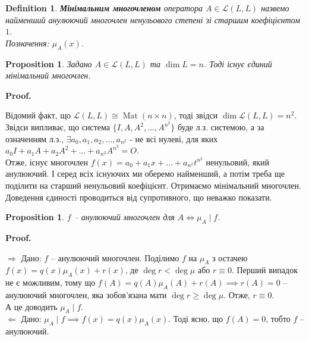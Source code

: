 \documentclass[a4paper, 10pt]{article}
\makeatletter
\def\rightproof{$\boxed{\Rightarrow}$ }
\def\leftproof{$\boxed{\Leftarrow}$ }
\theoremstyle{theoremdd}
\newtheorem{definition}[theorem]{Definition}
\newtheorem{proposition}[theorem]{Proposition}
\DeclareMathOperator{\Mat}{Mat}
\renewenvironment{proof}[1][Proof.\\]{\par
\pushQED{\hfill \qed}%
\normalfont \topsep6\p@\@plus6\p@\relax
\trivlist
\item\relax
{\bfseries
#1\@addpunct{.}}\hspace\labelsep\ignorespaces
}{%
\popQED\endtrivlist\@endpefalse
}
\makeatother
\begin{document}
\begin{definition}
\textbf{Мінімальним многочленом} оператора $A \in \mathcal{L}(L,L)$ назвемо найменший анулюючий многочлен ненульового степені зі старшим коефіцієнтом $1$.\\
Позначення: $\mu_A(x)$.
\end{definition}

\begin{proposition}
Задано $A \in \mathcal{L}(L,L)$ та $\dim L = n$. Тоді існує єдиний мінімальний многочлен.
\end{proposition}

\begin{proof}
Відомий факт, що $\mathcal{L}(L,L) \cong \Mat(n \times n)$, тоді звідси $\dim \mathcal{L}(L,L) = n^2$. Звідси випливає, що система $\{I,A,A^2,\dots,A^{n^2}\}$ буде л.з. системою, а за означенням л.з., $\exists a_0,a_1,a_2,\dots,a_{n^2}$ - не всі нулеві, для яких $a_0I + a_1A + a_2A^2 + \dots + a_{n^2} A^{n^2} = O$.\\
Отже, існує многочлен $f(x) = a_0 + a_1x + \dots + a_{n^2}t^{n^2}$ ненульовий, який анулюючий. І серед всіх існуючих ми оберемо найменший, а потім треба ще поділити на старший ненульовий коефіцієнт. Отримаємо мінімальний многочлен.\\
Доведення єдиності проводиться від супротивного, що неважко показати.
\end{proof}

\begin{proposition}
$f$ -- анулюючий многочлен для $A \iff \mu_A \mid f$.
\end{proposition}

\begin{proof}
\rightproof Дано: $f$ -- анулюючий многочлен. Поділимо $f$ на $\mu_A$ з остачею\\
$f(x) = q(x)\mu_A(x) + r(x)$, де $\deg r < \deg \mu$ або $r \equiv 0$. Перший випадок не є можливим, тому що $f(A) = q(A) \mu_A(A) + r(A) \implies r(A) = 0$ -- анулюючий многочлен, яка зобов'язана мати $\deg r \geq \deg \mu$. Отже, $r \equiv 0$.\\
А це доводить $\mu_A \mid f$.
\bigskip \\
\leftproof Дано: $\mu_A \mid f \implies f(x) = q(x) \mu_A(x)$. Тоді ясно, що $f(A) = 0$, тобто $f$ -- анулюючий.
\end{proof}
\end{document}
